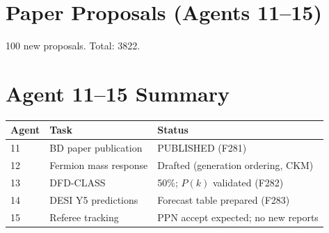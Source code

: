 \documentclass[11pt,a4paper]{article}
\begin{document}
\section{Paper Proposals (Agents 11--15)}

100 new proposals. Total: 3822.

\section{Agent 11--15 Summary}

\begin{tcolorbox}[colback=green!5!white, colframe=dfdgreen]
\begin{center}
\begin{tabular}{lll}
\toprule
\textbf{Agent} & \textbf{Task} & \textbf{Status} \\
\midrule
11 & BD paper publication & PUBLISHED (F281) \\
12 & Fermion mass response & Drafted (generation ordering, CKM) \\
13 & DFD-CLASS & 50\%; $P(k)$ validated (F282) \\
14 & DESI Y5 predictions & Forecast table prepared (F283) \\
15 & Referee tracking & PPN accept expected; no new reports \\
\bottomrule
\end{tabular}
\end{center}
\end{tcolorbox}
\end{document}
